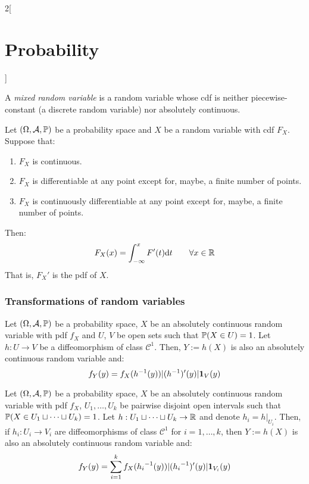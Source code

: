 \documentclass[../../../main.tex]{subfiles}
\begin{document}
\begin{multicols}{2}[\section{Probability}]
\begin{definition}
  \end{definition}
  \begin{definition}
    A \textit{mixed random variable} is a random variable whose cdf is neither piecewise-constant (a discrete random variable) nor absolutely  continuous.
  \end{definition}
  \begin{theorem}
    Let $(\Omega,\mathcal{A},\mathbb{P})$ be a probability space and $X$ be a random variable with cdf $F_X$. Suppose that:
    \begin{enumerate}
      \item $F_X$ is continuous.
      \item $F_X$ is differentiable at any point except for, maybe, a finite number of points.
      \item $F_X$ is continuously differentiable at any point except for, maybe, a finite number of points.
    \end{enumerate}
    Then: $$F_X(x)=\int_{-\infty}^xF'(t)\dd t\qquad\forall x\in\mathbb{R}$$
    That is, ${F_X}'$ is the pdf of $X$.
  \end{theorem}
  \subsubsection{Transformations of random variables}
  \begin{prop}
    Let $(\Omega,\mathcal{A},\mathbb{P})$ be a probability space, $X$ be an absolutely continuous random variable with pdf $f_X$ and $U$, $V$ be open sets such that $\mathbb{P}(X\in U)=1$. Let $h:U\rightarrow V$ be a diffeomorphism of class $\mathcal{C}^1$. Then, $Y:=h(X)$ is also an absolutely continuous random variable and: $$f_Y(y)=f_X(h^{-1}(y))|(h^{-1})'(y)|\boldsymbol{\mathrm{1}}_V(y)$$
  \end{prop}
  \begin{prop}
    Let $(\Omega,\mathcal{A},\mathbb{P})$ be a probability space, $X$ be an absolutely continuous random variable with pdf $f_X$, $U_1,\ldots, U_k$ be pairwise disjoint open intervals such that $\mathbb{P}(X\in U_1\sqcup \cdots\sqcup U_k)=1$. Let $h:U_1\sqcup \cdots\sqcup U_k\rightarrow \mathbb{R}$ and denote $h_i=h|_{U_i}$. Then, if $h_i:U_i\rightarrow V_i$ are  diffeomorphisms of class $\mathcal{C}^1$ for $i=1,\ldots,k$, then $Y:=h(X)$ is also an absolutely continuous random variable and: $$f_Y(y)=\sum_{i=1}^kf_X({h_i}^{-1}(y))|({h_i}^{-1})'(y)|\boldsymbol{\mathrm{1}}_{V_i}(y)$$
  \end{prop}

\end{multicols}
\end{document}
